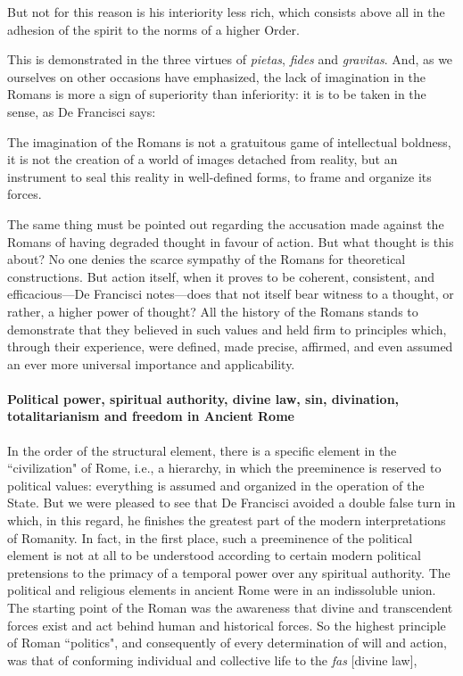 \begin{quotex}
But not for this reason is his interiority less rich, which consists above all in the adhesion of the spirit to the norms of a higher Order. 

\end{quotex}
This is demonstrated in the three virtues of \emph{pietas}, \emph{fides} and \emph{gravitas}. And, as we ourselves on other occasions have emphasized, the lack of imagination in the Romans is more a sign of superiority than inferiority: it is to be taken in the sense, as De Francisci says:

\begin{quotex}
The imagination of the Romans is not a gratuitous game of intellectual boldness, it is not the creation of a world of images detached from reality, but an instrument to seal this reality in well-defined forms, to frame and organize its forces. 

\end{quotex}
The same thing must be pointed out regarding the accusation made against the Romans of having degraded thought in favour of action. But what thought is this about? No one denies the scarce sympathy of the Romans for theoretical constructions. But action itself, when it proves to be coherent, consistent, and efficacious—De Francisci notes—does that not itself bear witness to a thought, or rather, a higher power of thought? All the history of the Romans stands to demonstrate that they believed in such values and held firm to principles which, through their experience, were defined, made precise, affirmed, and even assumed an ever more universal importance and applicability.

\paragraph*{Political power, spiritual authority, divine law, sin, divination, totalitarianism and freedom in Ancient Rome}

In the order of the structural element, there is a specific element in the ``civilization" of Rome, i.e., a hierarchy, in which the preeminence is reserved to political values: everything is assumed and organized in the operation of the State. But we were pleased to see that De Francisci avoided a double false turn in which, in this regard, he finishes the greatest part of the modern interpretations of Romanity. In fact, in the first place, such a preeminence of the political element is not at all to be understood according to certain modern political pretensions to the primacy of a temporal power over any spiritual authority. The political and religious elements in ancient Rome were in an indissoluble union. The starting point of the Roman was the awareness that divine and transcendent forces exist and act behind human and historical forces. So the highest principle of Roman ``politics", and consequently of every determination of will and action, was that of conforming individual and collective life to the \emph{fas} [divine law],

